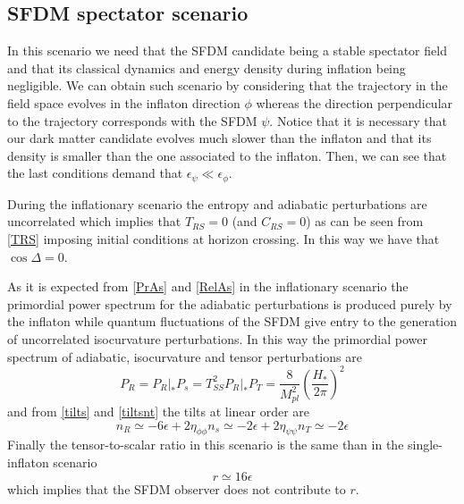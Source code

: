 \documentclass[amssymb,twocolumn,prd,nofootinbib,showpacs]{revtex4-1}
\begin{document}
\subsection{SFDM spectator scenario}

In this scenario we need that the SFDM candidate being a stable spectator field and that its classical dynamics and energy density during inflation being negligible. We can obtain such scenario by considering that the trajectory in the field space evolves in the inflaton direction $\phi$ whereas the direction perpendicular to the trajectory corresponds with the SFDM $\psi$. Notice that it is necessary that our dark matter candidate evolves much slower than the inflaton and that its density is smaller than the one associated to the inflaton. Then, we can see that the last conditions demand that $\epsilon_\psi\ll \epsilon_\phi$.

During the inflationary scenario the entropy and adiabatic perturbations are uncorrelated which implies that $T_{RS}=0$ (and $C_{RS}=0$) as can be seen from \eqref{TRS} imposing initial conditions at horizon crossing. In this way we have that $\cos\Delta =0$. 

As it  is expected from \eqref{PrAs} and \eqref{RelAs} in the inflationary scenario the primordial power spectrum for the adiabatic perturbations is produced purely by the inflaton while quantum fluctuations of the SFDM give entry to the generation of uncorrelated isocurvature perturbations. In this way the primordial power spectrum of adiabatic, isocurvature and tensor perturbations are
\begin{subequations}
\begin{equation}
P_R=P_R|_*
\end{equation}
\begin{equation}\label{PS1}
P_s=T_{SS}^2 P_R|_*
\end{equation}
\begin{equation}
P_T=\frac{8}{M_{pl}^2}\left(\frac{H_*}{2\pi}\right)^2
\end{equation}
\end{subequations}
and from \eqref{tilts} and \eqref{tiltsnt} the tilts at linear order are
\begin{subequations}
\begin{equation}
n_R\simeq-6\epsilon+2\eta_{\phi\phi}
\end{equation}
\begin{equation}
n_s\simeq-2\epsilon+2\eta_{\psi\psi}
 \end{equation}
\begin{equation}
n_T\simeq -2\epsilon
\end{equation}
\end{subequations}
Finally the tensor-to-scalar ratio in this scenario is the same than in the single-inflaton scenario
\begin{equation}
r\simeq 16\epsilon
\end{equation}
which implies that the SFDM observer does not contribute to $r$.
\end{document}
